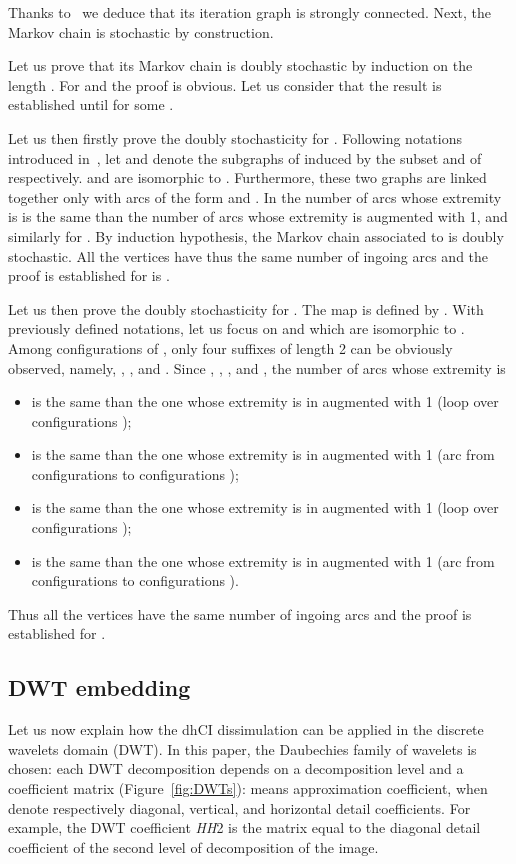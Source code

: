 \documentclass{comjnl}
\begin{document}
Thanks to~\cite[Theorem 2]{bcgr11:ip} we deduce that its iteration graph 
 is strongly connected. 
Next, the Markov chain is stochastic by construction. 

Let us prove that its Markov chain is doubly stochastic by induction on the 
length .
For  and  the proof is obvious. Let us consider that the 
result is established until  for some .

Let us then firstly prove the doubly stochasticity for .
Following notations introduced in~\cite{bcgr11:ip}, 
let   and  denote
the subgraphs of  induced by the subset 
and  of  respectively.
 and    are isomorphic to .
Furthermore, these two graphs are linked together only with arcs of the form
 and 
.
In  the number of arcs whose extremity is 
is  the same than the number of arcs whose extremity is  
augmented with 1, and similarly for .
By induction hypothesis, the Markov chain associated to  is doubly stochastic. All the vertices  have thus the same number of 
ingoing arcs and the proof is established for  is .

Let us then  prove the doubly stochasticity for .
The map  is defined by 
.
With previously defined  notations, let us focus on 
 and    which are isomorphic to . 
Among configurations of , only four suffixes of length 2 can be
obviously observed, namely, , ,  and .
Since 
, , 
, and , the number of 
arcs whose extremity is 
\begin{itemize}
\item 
 is the same than the one whose extremity is  in  augmented with 1 (loop over configurations );
\item 
 is the same than the one whose extremity is  in  augmented with 1 (arc from configurations 
 to configurations 
);
\item 
 is the same than the one whose extremity is  in  augmented with 1 (loop over configurations );
\item 
 is the same than the one whose extremity is  in  augmented with 1 (arc from configurations 
 to configurations 
).
\end{itemize}
Thus all the vertices  have  the same number of 
ingoing arcs and the proof is established for .




\subsection{DWT embedding}

Let us now explain how the dhCI dissimulation can be applied in
the discrete wavelets domain (DWT).
In this paper, the Daubechies family of wavelets is chosen: 
each DWT decomposition depends on a decomposition level and a coefficient
matrix (Figure~\ref{fig:DWTs}):  means approximation coefficient,
when  denote respectively diagonal, 
vertical, and horizontal detail coefficients. 
For example, the DWT coefficient \textit{HH}2 is the matrix equal to the 
diagonal detail coefficient of the second level of decomposition of the image.
\end{document}
